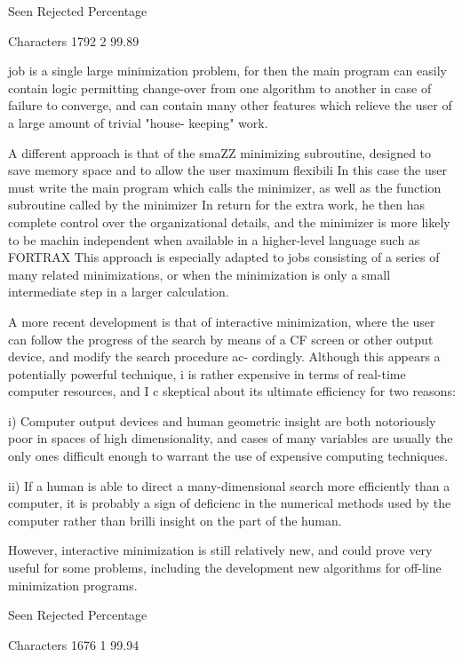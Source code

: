                  Seen Rejected  Percentage
 
Characters       1792        2   99.89
 
 
job is a single large minimization problem, for then the main program
can easily contain logic permitting change-over from one algorithm to
another in case of failure to converge, and can contain many other
features which relieve the user of a large amount of trivial "house-
keeping" work.
 
     A different approach is that of the smaZZ minimizing subroutine,
designed to save memory space and to allow the user maximum flexibili
In this case the user must write the main program which calls the
minimizer, as well as the function subroutine called by the minimizer
In return for the extra work, he then has complete control over the
organizational details, and the minimizer is more likely to be machin
independent when available in a higher-level language such as FORTRAX
This approach is especially adapted to jobs consisting of a series of
many related minimizations, or when the minimization is only a small
intermediate step in a larger calculation.
 
     A more recent development is that of interactive minimization,
where the user can follow the progress of the search by means of a CF
screen or other output device, and modify the search procedure ac-
cordingly.  Although this appears a potentially powerful technique, i
is rather expensive in terms of real-time computer resources, and I c
skeptical about its ultimate efficiency for two reasons:
 
  i) Computer output devices and human geometric insight are both
     notoriously poor in spaces of high dimensionality, and cases of
     many variables are usually the only ones difficult enough to
     warrant the use of expensive computing techniques.
 
 ii) If a human is able to direct a many-dimensional search more
     efficiently than a computer, it is probably a sign of deficienc
     in the numerical methods used by the computer rather than brilli
     insight on the part of the human.
 
     However, interactive minimization is still relatively new, and
could prove very useful for some problems, including the development
new  algorithms for off-line minimization programs.
 
                 Seen Rejected  Percentage
 
Characters       1676        1   99.94
 
